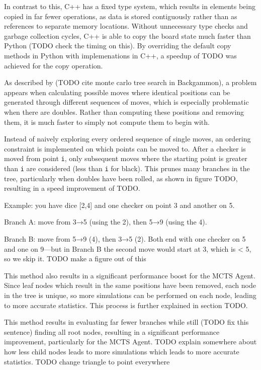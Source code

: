 In contrast to this, C++ has a fixed type system, which results in elements being copied in far fewer operations, as data is stored contiguously rather than as references to separate memory locations. Without unnecessary type checks and garbage collection cycles, C++ is able to copy the board state much faster than Python (TODO check the timing on this). By overriding the default copy methods in Python with implemenations in C++, a speedup of TODO was achieved for the copy operation.

As described by (TODO cite monte carlo tree search in Backgammon), a problem appears when calculating possible moves where identical positions can be generated through different sequences of moves, which is especially problematic when there are doubles. Rather than computing these positions and removing them, it is much faster to simply not compute them to begin with. 

Instead of naively exploring every ordered sequence of single moves, an ordering constraint is implemented on which points can be moved to. After a checker is moved from point \texttt{i}, only subsequent moves where the starting point is greater than \texttt{i} are considered (less than \texttt{i} for black). This prunes many branches in the tree, particularly when doubles have been rolled, as shown in figure TODO, resulting in a speed improvement of TODO. 

Example: you have dice [2,4] and one checker on point 3 and another on 5.

Branch A: move from 3→5 (using the 2), then 5→9 (using the 4).

Branch B: move from 5→9 (4), then 3→5 (2).
Both end with one checker on 5 and one on 9—but in Branch B the second move would start at 3, which is < 5, so we skip it.
TODO make a figure out of this

This method also results in a significant performance boost for the MCTS Agent. Since leaf nodes which result in the same positions have been removed, each node in the tree is unique, so more simulations can be performed on each node, leading to more accurate statistics. This process is further explained in section TODO.

This method results in evaluating far fewer branches while still (TODO fix this sentence) finding all root nodes, resulting in a significant performance improvement, particularly for the MCTS Agent. TODO explain somewhere about how less child nodes leads to more simulations which leads to more accurate statistics. 
TODO change triangle to point everywhere

